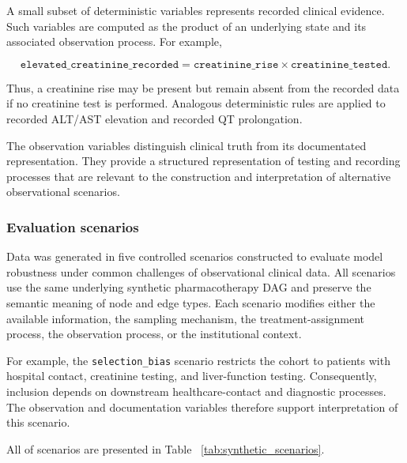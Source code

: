 A small subset of deterministic variables represents recorded clinical
evidence. Such variables are
computed as the product of an underlying state and its associated observation
process. For example,

\[
\texttt{elevated\_creatinine\_recorded}
=
\texttt{creatinine\_rise}
\times
\texttt{creatinine\_tested}.
\]

Thus, a creatinine rise may be present but
remain absent from the recorded data if no creatinine test is performed.
Analogous deterministic rules are applied to recorded ALT/AST elevation and
recorded QT prolongation.

The observation variables distinguish clinical truth from its documentated representation. They
provide a structured representation of testing and recording processes that
are relevant to the construction and interpretation of alternative
observational scenarios.


\subsubsection{Evaluation scenarios}



Data was generated in five controlled
scenarios constructed to evaluate model robustness under common
challenges of observational clinical data. All scenarios use the same
underlying synthetic pharmacotherapy DAG and preserve the semantic meaning of
node and edge types. Each scenario modifies either the available information,
the sampling mechanism, the treatment-assignment process, the observation
process, or the institutional context. 

For example, the \texttt{selection\_bias} scenario restricts the cohort to
patients with hospital contact, creatinine testing, and liver-function
testing. Consequently, inclusion depends on downstream healthcare-contact
and diagnostic processes. The observation and documentation variables therefore support
interpretation of this scenario.

All of scenarios are presented in Table ~\ref{tab:synthetic_scenarios}.

